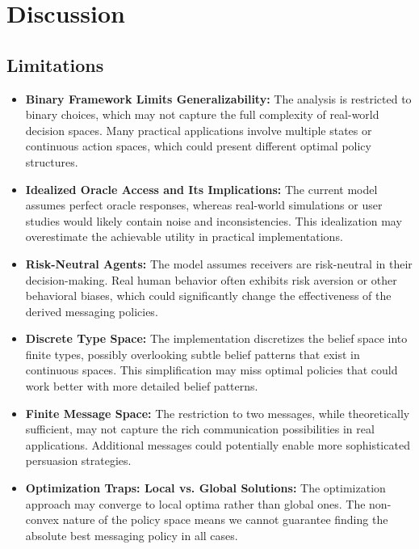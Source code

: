 \documentclass[12pt]{article}
\theoremstyle{plain}
\theoremstyle{definition}
\theoremstyle{remark}
\begin{document}
\section{Discussion}

\subsection{Limitations}

\begin{itemize}
    \item \textbf{Binary Framework Limits Generalizability:} The analysis is restricted to binary choices, which may not capture the full complexity of real-world decision spaces. Many practical applications involve multiple states or continuous action spaces, which could present different optimal policy structures.
    
    \item \textbf{Idealized Oracle Access and Its Implications:} The current model assumes perfect oracle responses, whereas real-world simulations or user studies would likely contain noise and inconsistencies. This idealization may overestimate the achievable utility in practical implementations.
    
    \item \textbf{Risk-Neutral Agents:} The model assumes receivers are risk-neutral in their decision-making. Real human behavior often exhibits risk aversion or other behavioral biases, which could significantly change the effectiveness of the derived messaging policies.
    
    \item \textbf{Discrete Type Space:} The implementation discretizes the belief space into finite types, possibly overlooking subtle belief patterns that exist in continuous spaces. This simplification may miss optimal policies that could work better with more detailed belief patterns.
    
    \item \textbf{Finite Message Space:} The restriction to two messages, while theoretically sufficient, may not capture the rich communication possibilities in real applications. Additional messages could potentially enable more sophisticated persuasion strategies.
    
    \item \textbf{Optimization Traps: Local vs. Global Solutions:} The optimization approach may converge to local optima rather than global ones. The non-convex nature of the policy space means we cannot guarantee finding the absolute best messaging policy in all cases.
\end{itemize}
\end{document}
